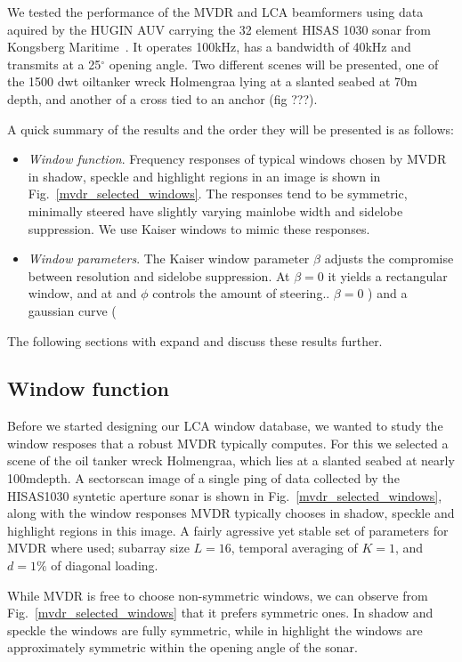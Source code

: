\documentclass[10pt,journal,draftclsnofoot,onecolumn]{IEEEtran}
\newcommand\Fig[1]{Fig.~\ref{#1}}
\newcommand\1{\vec 1}
\begin{document}
We tested the performance of the MVDR and LCA beamformers using data aquired by the HUGIN AUV carrying the 32 element HISAS 1030 sonar from Kongsberg Maritime~\cite{han09}. It operates 100\;kHz, has a bandwidth of 40\;kHz and transmits at a 25$^\circ$ opening angle. Two different scenes will be presented, one of the 1500 dwt oiltanker wreck Holmengraa lying at a slanted seabed at 70\;m depth, and another of a cross tied to an anchor (fig ???).

A quick summary of the results and the order they will be presented is as follows:

\begin{itemize}
\item \emph{Window function}. Frequency responses of typical windows chosen by MVDR in shadow, speckle and highlight regions in an image is shown in \Fig{mvdr_selected_windows}. The responses tend to be symmetric, minimally steered have slightly varying mainlobe width and sidelobe suppression. We use Kaiser windows to mimic these responses.
\item \emph{Window parameters}. The Kaiser window parameter $\beta$ adjusts the compromise between resolution and sidelobe suppression. At $\beta=0$ it yields a rectangular window, and at and $\phi$ controls the amount of steering.. $\beta=0$ ) and a gaussian curve (
\end{itemize}

The following sections with expand and discuss these results further.

\subsection{Window function}

Before we started designing our LCA window database, we wanted to study the window resposes that a robust MVDR typically computes. For this we selected a scene of the oil tanker wreck Holmengraa, which lies at a slanted seabed at nearly 100m\;depth. A sectorscan image of a single ping of data collected by the HISAS1030 syntetic aperture sonar is shown in \Fig{mvdr_selected_windows}, along with the window responses MVDR typically chooses in shadow, speckle and highlight regions in this image. A fairly agressive yet stable set of parameters for MVDR where used; subarray size $L=16$, temporal averaging of $K=1$, and $d=1\%$ of diagonal loading.

While MVDR is free to choose non-symmetric windows, we can observe from \Fig{mvdr_selected_windows} that it prefers symmetric ones. In shadow and speckle the windows are fully symmetric, while in highlight the windows are approximately symmetric within the opening angle of the sonar. 
\end{document}
